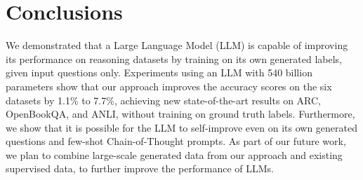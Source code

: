 \section{Conclusions}
\label{sec:conclusions}

We demonstrated that a Large Language Model (LLM) is capable of improving its performance on reasoning datasets by training on its own generated labels, given input questions only. Experiments using an LLM with 540 billion parameters show that our approach improves the accuracy scores on the six datasets by 1.1\% to 7.7\%, achieving new state-of-the-art results on ARC, OpenBookQA, and ANLI, without training on ground truth labels. Furthermore, we show that it is possible for the LLM to self-improve even on its own generated questions and few-shot Chain-of-Thought prompts. As part of our future work, we plan to combine large-scale generated data from our approach and existing supervised data, to further improve the performance of LLMs.